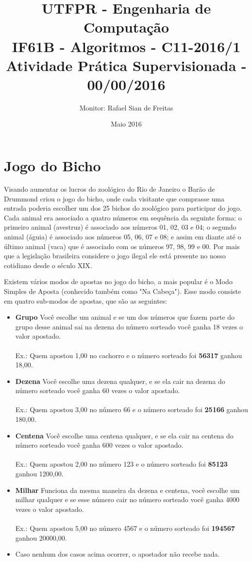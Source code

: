 \documentclass{article}
\title{UTFPR - Engenharia de Computação\\
		IF61B - Algoritmos - C11-2016/1\\
		Atividade Prática Supervisionada - 00/00/2016}
\author{Monitor: Rafael Sian de Freitas }
\date{Maio 2016}
\begin{document}
\maketitle

\section{Jogo do Bicho}
Visando aumentar os lucros do zoológico do Rio de Janeiro o Barão de Drummond criou o jogo do bicho, onde cada visitante que comprasse uma entrada poderia escolher um dos 25 bichos do zoológico para participar do jogo. Cada animal era associado a quatro números em sequência da seguinte forma: o primeiro animal (avestruz) é associado aos números 01, 02, 03 e 04; o segundo animal (águia) é associado aos números 05, 06, 07 e 08; e assim em diante até o último animal (vaca) que é associado com os números 97, 98, 99 e 00. Por mais que a legislação brasileira considere o jogo ilegal ele está presente no nosso cotidiano desde o século XIX. 

Existem vários modos de apostas no jogo do bicho, a mais popular é o Modo Simples de Aposta (conhecido também como "Na Cabeça"). Esse modo consiste em quatro sub-modos de apostas, que são as seguintes:

\begin{itemize}
	\item \textbf{Grupo} Você escolhe um animal e se um dos números que fazem parte do grupo desse animal sai na dezena do número sorteado você ganha 18 vezes o valor apostado.\\\\
	Ex.: Quem apostou 1,00 no cachorro e o número sorteado foi \textbf{56317} ganhou 18,00. 
	
	\item \textbf{Dezena} Você escolhe uma dezena qualquer, e se ela cair na dezena do número sorteado você ganha 60 vezes o valor apostado.\\\\
	Ex.: Quem apostou 3,00 no número 66 e o número sorteado foi \textbf{25166} ganhou 180,00. 
	
	\item \textbf{Centena} Você escolhe uma centena qualquer, e se ela cair na centena do número sorteado você ganha 600 vezes o valor apostado.\\\\
	Ex.: Quem apostou 2,00 no número 123 e o número sorteado foi \textbf{85123} ganhou 1200,00. 
	
	\item \textbf{Milhar} Funciona da mesma maneira da dezena e centena, você escolhe um milhar qualquer e se esse número cair no número sorteado você ganha 4000 vezes o valor apostado.\\\\
	Ex.: Quem apostou 5,00 no número 4567 e o número sorteado foi \textbf{194567} ganhou 20000,00. 
	
	\item Caso nenhum dos casos acima ocorrer, o apostador não recebe nada.
\end{itemize}
\end{document}
